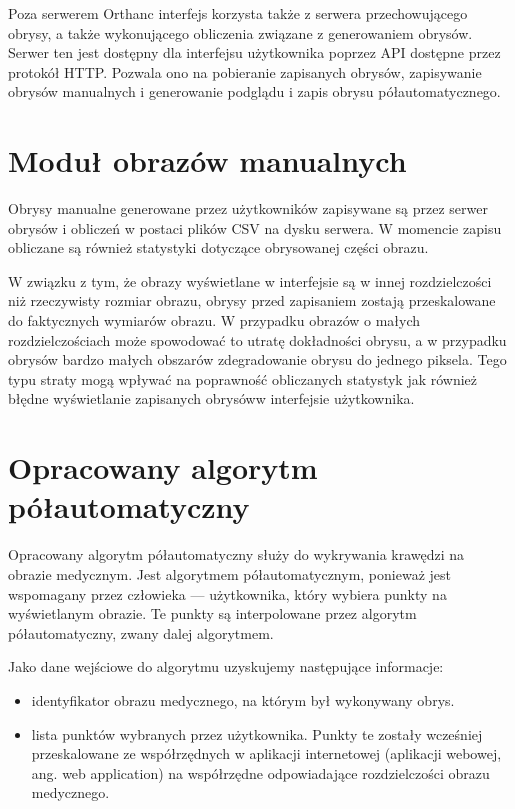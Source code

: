 \documentclass[a4paper,11pt,twoside,openright]{report}
\theoremstyle{definition}
\begin{document}
Poza serwerem Orthanc interfejs korzysta także z serwera przechowującego obrysy, a także wykonującego obliczenia związane z generowaniem obrysów. Serwer ten jest dostępny dla interfejsu użytkownika poprzez API dostępne przez protokół HTTP. Pozwala ono na pobieranie zapisanych obrysów, zapisywanie obrysów manualnych i generowanie podglądu i zapis obrysu półautomatycznego.

\section {Moduł obrazów manualnych}

Obrysy manualne generowane przez użytkowników zapisywane są przez serwer obrysów i obliczeń w postaci plików CSV na dysku serwera. W momencie zapisu obliczane są również statystyki dotyczące obrysowanej części obrazu.

W związku z tym, że obrazy wyświetlane w interfejsie są w innej rozdzielczości niż rzeczywisty rozmiar obrazu, obrysy przed zapisaniem zostają przeskalowane do faktycznych wymiarów obrazu. W przypadku obrazów o małych rozdzielczościach może spowodować to utratę dokładności obrysu, a w przypadku obrysów bardzo małych obszarów zdegradowanie obrysu do jednego piksela. Tego typu straty mogą wpływać na poprawność obliczanych statystyk jak również błędne wyświetlanie zapisanych obrysóww interfejsie użytkownika.

\section {Opracowany algorytm półautomatyczny}

Opracowany algorytm półautomatyczny służy do wykrywania krawędzi na obrazie medycznym. Jest algorytmem półautomatycznym, ponieważ jest wspomagany przez człowieka --- użytkownika, który wybiera punkty na wyświetlanym obrazie. Te punkty są interpolowane przez algorytm półautomatyczny, zwany dalej algorytmem.

Jako dane wejściowe do algorytmu uzyskujemy następujące informacje:
\begin{itemize}[noitemsep]
\item {identyfikator obrazu medycznego, na którym był wykonywany obrys.}
\item {lista punktów wybranych przez użytkownika. Punkty te zostały wcześniej przeskalowane ze współrzędnych w aplikacji internetowej (aplikacji webowej, ang. web application) na współrzędne odpowiadające rozdzielczości obrazu medycznego.}
\end{itemize}
\end{document}
